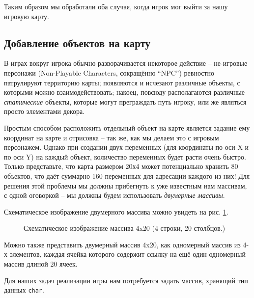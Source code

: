 \documentclass[../sparc.tex]{subfiles}
\begin{document}
Таким образом мы обработали оба случая, когда игрок мог выйти за нашу игровую
карту.

\subsection{Добавление объектов на карту}

В играх вокруг игрока обычно разворачивается некоторое действие -- не-игровые
персонажи (Non-Playable Characters, сокращённо ``NPC'') ревностно патрулируют
территорию карты; появляются и исчезают различные объекты, с которыми можно
взаимодействовать; накоец, повсюду располагаются различные \emph{статические}
объекты, которые могут преграждать путь игроку, или же являться просто
элементами декора.

Простым способом расположить отдельный объект на карте является задание ему
координат на карте и отрисовка -- так же, как мы делаем это с игровым
персонажем.  Однако при создании двух переменных (для координаты по оси X и по
оси Y) на каждый объект, количество переменных будет расти очень быстро.  Только
представьте, что карта размером 20х4 может потенциально хранить 80 объектов, что
даёт суммарно 160 переменных для адресации каждого из них!  Для решения этой
проблемы мы должны прибегнуть к уже известным нам массивам, с одной оговоркой --
мы должны будем использовать \emph{двумерные массивы}.

Схематическое изображение двумерного массива можно увидеть на
рис. \ref{fig:2d-array-example}.

\begin{figure}[ht]
  \centering
  \caption{Схематическое изображение массива 4x20 (4 строки, 20 столбцов.)}
  \label{fig:2d-array-example}
\end{figure}

Можно также представить двумерный массив 4x20, как одномерный массив из 4-х
элементов, каждая ячейка которого содержит ссылку на ещё один одномерный массив
длиной 20 ячеек.

Для наших задач реализации игры нам потребуется задать массив, хранящий тип
данных \texttt{char}.
\end{document}
